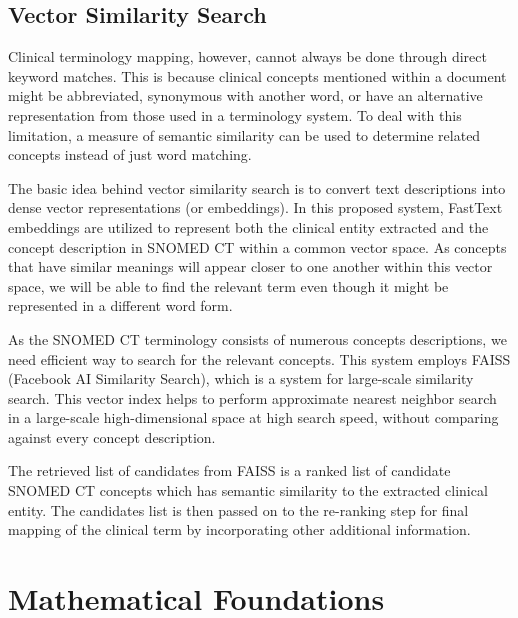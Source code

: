 \subsection{Vector Similarity Search}

Clinical terminology mapping, however, cannot always be done through direct keyword matches. This is because clinical concepts mentioned within a document might be abbreviated, synonymous with another word, or have an alternative representation from those used in a terminology system. To deal with this limitation, a measure of semantic similarity can be used to determine related concepts instead of just word matching.

The basic idea behind vector similarity search is to convert text descriptions into dense vector representations (or embeddings). In this proposed system, FastText embeddings\cite{ref17} are utilized to represent both the clinical entity extracted and the concept description in SNOMED CT within a common vector space. As concepts that have similar meanings will appear closer to one another within this vector space, we will be able to find the relevant term even though it might be represented in a different word form.

As the SNOMED CT terminology consists of numerous concepts descriptions, we need efficient way to search for the relevant concepts. This system employs FAISS (Facebook AI Similarity Search)\cite{ref20}, which is a system for large-scale similarity search. This vector index helps to perform approximate nearest neighbor search in a large-scale high-dimensional space at high search speed, without comparing against every concept description.

The retrieved list of candidates from FAISS is a ranked list of candidate SNOMED CT concepts which has semantic similarity to the extracted clinical entity. The candidates list is then passed on to the re-ranking step for final mapping of the clinical term by incorporating other additional information.

\section{Mathematical Foundations}

